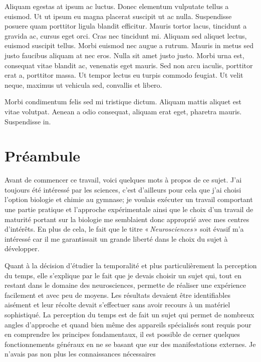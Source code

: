 \documentclass[12pt,fleqn,oneside,french,openany]{book} %
\begin{document}
Aliquam egestas at ipsum ac luctus. Donec elementum vulputate tellus a euismod. Ut ut ipsum eu magna placerat suscipit ut ac nulla. Suspendisse posuere quam porttitor ligula blandit efficitur. Mauris tortor lacus, tincidunt a gravida ac, cursus eget orci. Cras nec tincidunt mi. Aliquam sed aliquet lectus, euismod suscipit tellus. Morbi euismod nec augue a rutrum. Mauris in metus sed justo faucibus aliquam at nec eros. Nulla sit amet justo justo. Morbi urna est, consequat vitae blandit ac, venenatis eget mauris. Sed non arcu iaculis, porttitor erat a, porttitor massa. Ut tempor lectus eu turpis commodo feugiat. Ut velit neque, maximus ut vehicula sed, convallis et libero.

Morbi condimentum felis sed mi tristique dictum. Aliquam mattis aliquet est vitae volutpat. Aenean a odio consequat, aliquam erat eget, pharetra mauris. Suspendisse in. 

\section{Préambule}
Avant de commencer ce travail, voici quelques mots à propos de ce sujet. J'ai toujours été intéressé par les sciences, c'est d'ailleurs pour cela que j'ai choisi l'option biologie et chimie au gymnase; je voulais exécuter un travail comportant une partie pratique et l'approche expérimentale ainsi que le choix d'un travail de maturité portant sur la biologie me semblaient donc approprié avec mes centres d'intérêts. En plus de cela, le fait que le titre «\,\emph{Neurosciences}\,» soit évasif m'a intéressé car il me garantissait un grande liberté dans le choix du sujet à développer.

Quant à la décision d'étudier la temporalité et plus particulièrement la perception du temps, elle s'explique par le fait que je devais choisir un sujet qui, tout en restant dans le domaine des neurosciences, permette de réaliser une expérience facilement et avec peu de moyens. Les résultats devaient être identifiables aisément et leur récolte devait s'effectuer sans avoir recours à un matériel sophistiqué. La perception du temps est de fait un sujet qui permet de nombreux angles d'approche et quand bien même des appareils spécialisés sont requis pour en comprendre les principes fondamentaux, il est possible de cerner quelques fonctionnements généraux en ne se basant que sur des manifestations externes. Je n'avais pas non plus les connaissances nécessaires 
\end{document}
